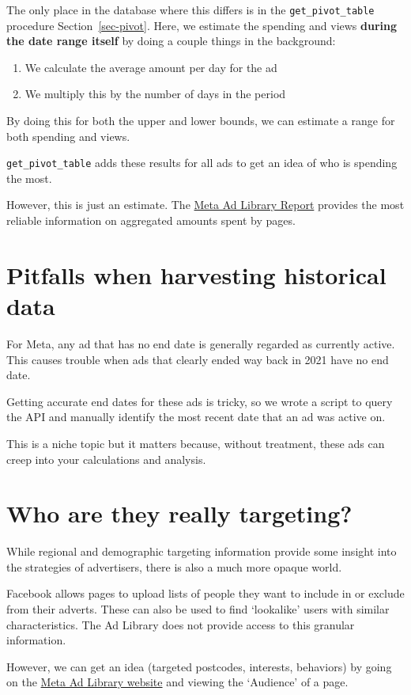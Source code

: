 \documentclass[
  letterpaper,
  DIV=11,
  numbers=noendperiod]{scrreprt}
\providecommand{\tightlist}{%
  \setlength{\itemsep}{0pt}\setlength{\parskip}{0pt}}\usepackage{longtable,booktabs,array}
\begin{document}
The only place in the database where this differs is in the
\texttt{get\_pivot\_table} procedure Section~\ref{sec-pivot}. Here, we
estimate the spending and views \textbf{during the date range itself} by
doing a couple things in the background:

\begin{enumerate}
\def\labelenumi{\arabic{enumi}.}
\tightlist
\item
  We calculate the average amount per day for the ad
\item
  We multiply this by the number of days in the period
\end{enumerate}

By doing this for both the upper and lower bounds, we can estimate a
range for both spending and views.

\texttt{get\_pivot\_table} adds these results for all ads to get an idea
of who is spending the most.

However, this is just an estimate. The
\href{https://m.facebook.com/ads/library/report/}{Meta Ad Library
Report} provides the most reliable information on aggregated amounts
spent by pages.

\section{Pitfalls when harvesting historical
data}\label{pitfalls-when-harvesting-historical-data}

For Meta, any ad that has no end date is generally regarded as currently
active. This causes trouble when ads that clearly ended way back in 2021
have no end date.

Getting accurate end dates for these ads is tricky, so we wrote a script
to query the API and manually identify the most recent date that an ad
was active on.

This is a niche topic but it matters because, without treatment, these
ads can creep into your calculations and analysis.

\section{Who are they really
targeting?}\label{who-are-they-really-targeting}

While regional and demographic targeting information provide some
insight into the strategies of advertisers, there is also a much more
opaque world.

Facebook allows pages to upload lists of people they want to include in
or exclude from their adverts. These can also be used to find
`lookalike' users with similar characteristics. The Ad Library does not
provide access to this granular information.

However, we can get an idea (targeted postcodes, interests, behaviors)
by going on the \href{https://www.facebook.com/ads/library}{Meta Ad
Library website} and viewing the `Audience' of a page.
\end{document}

